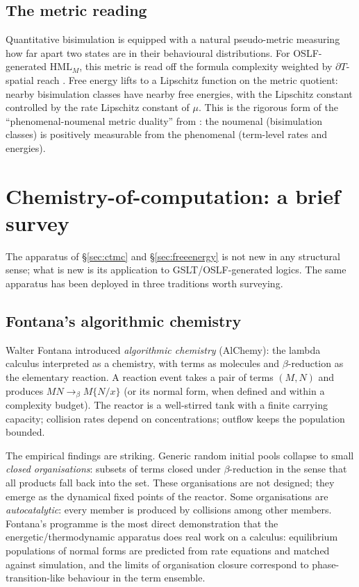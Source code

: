 \documentclass[11pt]{article}
\theoremstyle{plain}
\theoremstyle{definition}
\theoremstyle{remark}
\newcommand{\HML}{\mathrm{HML}}
\newcommand{\bd}{\partial}
\begin{document}
\subsection{The metric reading}

Quantitative bisimulation is equipped with a natural pseudo-metric \cite{vBW01,DGJP04} measuring how far apart two states are in their behavioural distributions. For OSLF-generated $\HML_M$, this metric is read off the formula complexity weighted by $\bd T$-spatial reach \cite{gslt-context}. Free energy lifts to a Lipschitz function on the metric quotient: nearby bisimulation classes have nearby free energies, with the Lipschitz constant controlled by the rate Lipschitz constant of $\mu$. This is the rigorous form of the ``phenomenal-noumenal metric duality'' from \cite{gslt-context}: the noumenal (bisimulation classes) is positively measurable from the phenomenal (term-level rates and energies).

\section{Chemistry-of-computation: a brief survey}\label{sec:chemistry}

The apparatus of \S\ref{sec:ctmc} and \S\ref{sec:freeenergy} is not new in any structural sense; what is new is its application to GSLT/OSLF-generated logics. The same apparatus has been deployed in three traditions worth surveying.

\subsection{Fontana's algorithmic chemistry}

Walter Fontana \cite{Fontana91,FontanaBuss94,FontanaBuss96} introduced \emph{algorithmic chemistry} (AlChemy): the lambda calculus interpreted as a chemistry, with terms as molecules and $\beta$-reduction as the elementary reaction. A reaction event takes a pair of terms $(M, N)$ and produces $M N \to_\beta M\{N/x\}$ (or its normal form, when defined and within a complexity budget). The reactor is a well-stirred tank with a finite carrying capacity; collision rates depend on concentrations; outflow keeps the population bounded.

The empirical findings are striking. Generic random initial pools collapse to small \emph{closed organisations}: subsets of terms closed under $\beta$-reduction in the sense that all products fall back into the set. These organisations are not designed; they emerge as the dynamical fixed points of the reactor. Some organisations are \emph{autocatalytic}: every member is produced by collisions among other members. Fontana's programme is the most direct demonstration that the energetic/thermodynamic apparatus does real work on a calculus: equilibrium populations of normal forms are predicted from rate equations and matched against simulation, and the limits of organisation closure correspond to phase-transition-like behaviour in the term ensemble.
\end{document}
